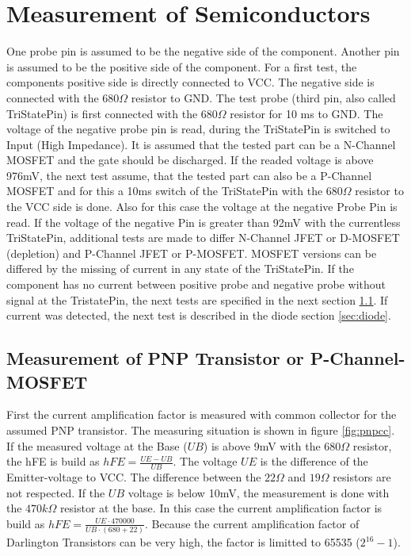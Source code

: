 \section{Measurement of Semiconductors}
One probe pin is assumed to be the negative side of the component.
Another pin is assumed to be the positive side of the component.
For a first test, the components positive side is directly connected to VCC.
The negative side is connected with the \(680\Omega\) resistor to GND.
The test probe (third pin, also called TriStatePin) is first connected with the \(680\Omega\) resistor
for 10 ms to GND. The voltage of the negative probe pin is read, during  the TriStatePin is
switched to Input (High Impedance). It is assumed that the tested part can be
a N-Channel MOSFET and the gate should be discharged.
If the readed voltage is above 976mV, the next test assume, that the tested part can
also be a P-Channel MOSFET and for this a 10ms switch of the TriStatePin with the \(680\Omega\) resistor
to the VCC side is done.
Also for this case the voltage at the negative Probe Pin is read.
If the voltage of the negative Pin is greater than 92mV with the
currentless TriStatePin, additional tests are made to differ N-Channel JFET or D-MOSFET (depletion)
and P-Channel JFET or P-MOSFET. MOSFET versions can be differed by the missing of current in any state
of the TriStatePin.
If the component has no current between positive probe and negative probe without signal at the
TristatePin, the next tests are specified in the next section \ref{sec:pnp}.
If current was detected, the next test is described in the diode section \ref{sec:diode}.

\subsection{Measurement of PNP Transistor or P-Channel-MOSFET}
\label{sec:pnp}
First the current amplification factor is measured with common collector for the assumed PNP transistor.
The measuring situation is shown in figure \ref{fig:pnpcc}.
If the measured voltage at the Base (\(UB\)) is above 9mV with the \(680\Omega\) resistor,
the hFE is build as \(hFE = \frac{UE-UB}{UB}\). The voltage \(UE\) is the difference of the Emitter-voltage to VCC.
The difference between the \(22\Omega\) and \(19\Omega\) resistors are not respected.
If the \(UB\) voltage is below 10mV, the measurement is done with the \(470k\Omega\) resistor at the base.
In this case the current amplification factor is build as \(hFE = \frac{UE \cdot 470000}{UB \cdot (680+22)}\).
Because the current amplification factor of Darlington Transistors can be very high, the factor is limitted 
 to 65535 (\(2^{16}-1\)). 

